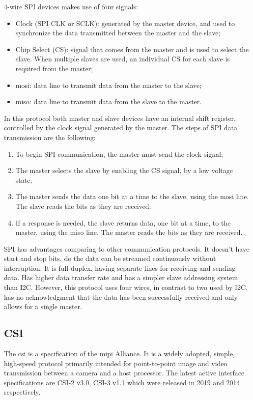 4-wire SPI devices makes use of four signals:
\begin{itemize}
	\item Clock (SPI CLK or SCLK): generated by the master device, and used to synchronize the data transmitted between the master and the slave;
	\item Chip Select (CS): signal that comes from the master and is used to select the slave. When multiple slaves are used, an individual CS for each slave is required from the master;
	\item \ac{mosi}: data line to transmit data from the master to the slave;
	\item \ac{miso}: data line to transmit data from the slave to the master.
\end{itemize}


In this protocol both master and slave devices have an internal shift register, controlled by the clock signal generated by the master. The steps of SPI data transmission are the following:
\begin{enumerate}
	\item To begin SPI communication, the master must send the clock signal;
	\item The master selects the slave by enabling the CS signal, by a low voltage state;
	\item The master sends the data one bit at a time to the slave, using the \ac{mosi} line. The slave reads the bits as they are received;
	\item If a response is needed, the slave returns data, one bit at a time, to the master, using the \ac{miso} line. The master reads the bits as they are received.
\end{enumerate}

SPI has advantages comparing to other communication protocols. It doesn't have start and stop bits, do the data can be streamed continuously without interruption. It is full-duplex, having separate lines for receiving and sending data. Has higher data transfer rate and has a simpler slave addressing system than I2C. However, this protocol uses four wires, in contrast to two used by I2C, has no acknowledgment that the data has been successfully received and only allows for a single master. \cite{spi_basics}

\clearpage
\subsection{CSI}
The \ac{csi} is a specification of the \ac{mipi} Alliance. It is a widely adopted, simple, high-speed protocol primarily intended for point-to-point image and video transmission between a camera and a host processor. The latest active interface specifications are CSI-2 v3.0, CSI-3 v1.1 which were released in 2019 and 2014 respectively. \cite{csi_basics}

